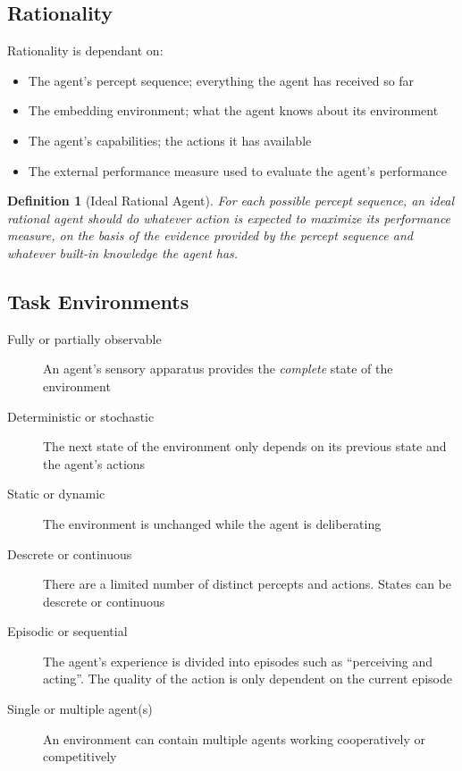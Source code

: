 \documentclass[a4paper]{article}
\newtheorem{definition}{Definition}[section]
\begin{document}
\subsection{Rationality}
Rationality is dependant on:
\begin{itemize}
  \item The agent's percept sequence; everything the agent has received so far
  \item The embedding environment; what the agent knows about its environment
  \item The agent's capabilities; the actions it has available
  \item The external performance measure used to evaluate the agent's
    performance
\end{itemize}

\begin{definition}[Ideal Rational Agent]
  For each possible percept sequence, an ideal rational agent should do whatever
  action is expected to maximize its performance measure, on the basis of the
  evidence provided by the percept sequence and whatever built-in knowledge the
  agent has.
\end{definition}

\subsection{Task Environments}
\begin{description}
  \item[Fully or partially observable] An agent's sensory apparatus provides the
    \textit{complete} state of the environment
  \item[Deterministic or stochastic] The next state of the environment only
    depends on its previous state and the agent's actions
  \item[Static or dynamic] The environment is unchanged while the agent is
    deliberating
  \item[Descrete or continuous] There are a limited number of distinct percepts
    and actions. States can be descrete or continuous
  \item[Episodic or sequential] The agent's experience is divided into episodes
    such as ``perceiving and acting''. The quality of the action is only
    dependent on the current episode
  \item[Single or multiple agent(s)] An environment can contain multiple agents
    working cooperatively or competitively
\end{description}
\end{document}
